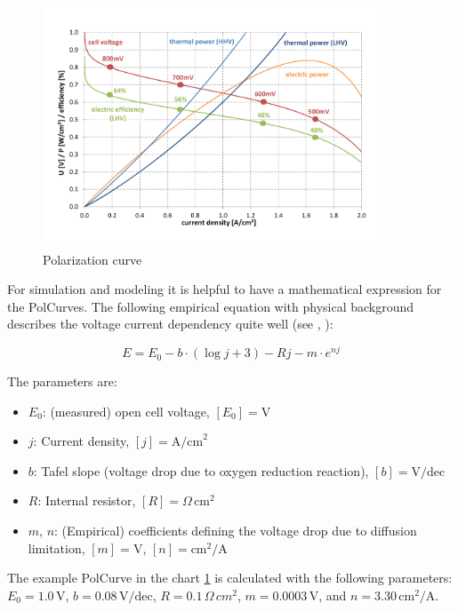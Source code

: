 \documentclass[11pt,a4paper,english,twoside]{scrreprt}
\begin{document}
\begin{figure}
  \centering
  \includegraphics*[width=0.9\textwidth,angle=0]{FCF_Chart_PolCurve.pdf}
  \caption[Polarization curve]{Polarization curve}
  \label{fig:PolCurve}
\end{figure}

For simulation and modeling it is helpful to have a mathematical expression for the PolCurves. The following empirical equation with physical background describes the 
voltage current dependency quite well (see \cite{lit:Srinivasan}, \cite{lit:Kim}):

\begin{equation}
  \label{eqn:E_empirical}
  E = E_0 - b \cdot (\log j +3) - R j - m \cdot e^{n j}
\end{equation}

The parameters are:
\begin{itemize}
	\item $E_0$: (measured) open cell voltage, $[E_0]=\si{\volt}$
	\item $j$: Current density, $[j]=\text{A/cm}^{\text{2}}$
	\item $b$: Tafel slope (voltage drop due to oxygen reduction reaction), $[b]=\text{V/dec}$
	\item $R$: Internal resistor, $[R]=\Omega\,\text{cm}^{\text{2}}$
	\item $m$, $n$: (Empirical) coefficients defining the voltage drop due to diffusion limitation, $[m]=\si{\volt}$, $[n]=\text{cm}^\text{2}/\text{A}$

\end{itemize}

The example PolCurve in the chart \ref{fig:PolCurve} is calculated with the following parameters: $E_0=1.0\,\mathrm{V}$, $b=0.08\,\mathrm{V/dec}$, $R=0.1\,\Omega\,cm^2$, $m=0.0003\,\mathrm{V}$, and $n=3.30\,\mathrm{cm^2/A}$.
\end{document}
